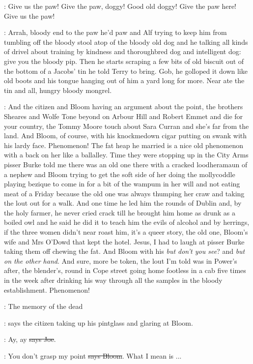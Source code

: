\doran:
Give us the paw! Give the paw, doggy! Good old doggy! Give the paw
here!
Give us the paw!

\Nq:
Arrah, bloody end to the paw he'd paw and Alf trying to keep him
from tumbling off the bloody stool atop of the bloody old dog and he
talking all kinds of drivel about training by kindness and thoroughbred
dog and intelligent dog: give you the bloody pip. Then he starts scraping
a few bits of old biscuit out of the bottom of a Jacobs' tin he told Terry
to bring. Gob, he golloped it down like old boots and his tongue hanging
out of him a yard long for more. Near ate the tin and all, hungry bloody
mongrel.

\Nq:
And the citizen and Bloom having an argument about the point, the
brothers Sheares and Wolfe Tone beyond on Arbour Hill and Robert
Emmet and die for your country,
the Tommy Moore touch about Sara
Curran and she's far from the land. And Bloom, of course, with his
knockmedown cigar putting on swank with his lardy face. Phenomenon!
The fat heap he married is a nice old phenomenon with a back on her like a
ballalley. Time they were stopping up in the City Arms pisser Burke told
me there was an old one there with a cracked loodheramaun of a nephew and
Bloom trying to get the soft side of her doing the mollycoddle playing
bezique to come in for a bit of the wampum in her will and not eating meat
of a Friday because the old one was always thumping her craw and taking
the lout out for a walk. And one time he led him the rounds of Dublin and,
by the holy farmer,
he never cried crack till he brought him home as drunk
as a boiled owl and he said he did it to teach him the evils of alcohol
and by herrings, if the three women didn't near roast him, it's a queer
story, the old one, Bloom's wife and Mrs O'Dowd that kept the hotel.
Jesus, I had to laugh at pisser Burke taking them off chewing the fat.
And Bloom with his \emph{but don't you see}? and
\emph{but on the other hand}. And sure,
more be token, the lout I'm told was in Power's after, the blender's,
round in Cope street going home footless in a cab five times in the week
after drinking his way through all the samples in the bloody
establishment. Phenomenon!

\citizen:
The memory of the dead

\Nq:
says the citizen taking up his pintglass and
glaring at Bloom.%

\joe:
Ay, ay \sout{says Joe}.

\Bloom:
You don't grasp my point \sout{says Bloom}.
What I mean is ...


